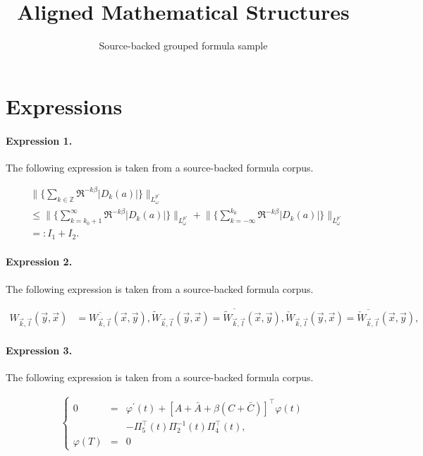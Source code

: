 \documentclass[11pt]{article}
\title{Aligned Mathematical Structures}
\author{Source-backed grouped formula sample}
\date{}
\begin{document}
\maketitle
\section{Expressions}
\paragraph{Expression 1.} The following expression is taken from a source-backed formula corpus.

\begin{align*}&\Big\|\Big\{\sum_{k\in \mathbb Z}{\mathfrak R}^{-k\beta}|D_k(a)|\Big\}\Big\|_{L^{p'}_{\omega}}\\&\le \Big\|\Big\{\sum_{k=k_0+1}^\infty{\mathfrak R}^{-k\beta}|D_k(a)|\Big\}\Big\|_{L^{p'}_{\omega}} + \Big\|\Big\{\sum_{k=-\infty}^{k_0}{\mathfrak R}^{-k\beta}|D_k(a)|\Big\}\Big\|_{L^{p'}_{\omega}}\\ &=:I_1+I_2.\end{align*}

\paragraph{Expression 2.} The following expression is taken from a source-backed formula corpus.

\begin{align*}W_{\vec{k}, \vec{l}}(\vec{y}, \vec{x}) &= \overline{W_{\vec{k}, \vec{l}}}(\vec{x}, \vec{y}), \tilde{W}_{\vec{k}, \vec{l}}(\vec{y}, \vec{x}) = \overline{\tilde{W}_{\vec{k}, \vec{l}}}(\vec{x}, \vec{y}), \check{W}_{\vec{k}, \vec{l}}(\vec{y}, \vec{x}) = \overline{\check{W}_{\vec{k}, \vec{l}}}(\vec{x}, \vec{y}),\end{align*}

\paragraph{Expression 3.} The following expression is taken from a source-backed formula corpus.

\begin{align*}\left\{\begin{array}{rcl}0 & = & \varphi ^{\prime }\left( t\right) +\left[ A+\bar{A}+\beta \left( C+\bar{C}\right) \right] ^{\top }\varphi \left( t\right) \\& & -\Pi _{5}^{\top }\left( t\right) \Pi _{2}^{-1}\left( t\right) \Pi_{4}^{\top }\left( t\right) , \\\varphi \left( T\right) & = & 0\end{array}\right. \end{align*}
\end{document}
